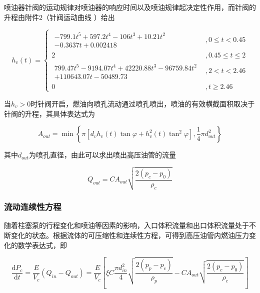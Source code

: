 \documentclass[withoutpreface,bwprint]{cumcmthesis} %
\begin{document}
			喷油器针阀的运动规律对喷油器的响应时间以及喷油规律起决定性作用，而针阀的升程由附件2（针阀运动曲线 ）给出
			
			\begin{equation}
			h_v(t) = \left\{ \begin{array}{ll} \begin{array}{ll}
			-799.1 t^5 + 597.2 t^4 - 106 t^3 + 10.21 t^2 \\ -  0.3637 t + 0.002418 \end{array} &, 0 \leq t < 0.45 \\
			2 &, 0.45 \leq t \leq 2 \\
			\begin{array}{ll}
			799.47t^5 - 9194.07 t^4 + 42220.88 t^3 - 96759.84 t^2 \\ + 110643.07 t - 50489.73 
			\end{array} &, 2 < t < 2.46 \\
			0 &, t \geq 2.46
			\end{array} \right.
			\end{equation}
			
			当$h_v > 0$时针阀开启，燃油向喷孔流动通过喷孔喷出，喷油的有效横截面积取决于针阀的升程，其具体表达式为
			
			\begin{equation}A_{out} = \min\left\{ \pi[d_v h_v(t) \tan \varphi + h_v^2(t) \tan^2\varphi ], \frac{1}{4} \pi d_{out}^2 \right\}\end{equation}
			
			其中$d_{out}$为喷孔直径，由此可以求出喷出高压油管的流量
			
			\begin{equation}Q_{out} = CA_{out} \sqrt{\frac{2(p_c - p_0)}{\rho_c}}\end{equation}
			
			
			
			\subsubsection{流动连续性方程}
			
			随着柱塞泵的行程变化和喷油等因素的影响，入口体积流量和出口体积流量处于不断变化的状态。根据流体的可压缩性和连续性方程，可得到高压油管内燃油压力变化的数学表达式，即
			
			\begin{equation}\frac{\mathrm{d}P_c}{\mathrm{d}t} = \frac{E}{V_c}(Q_{in} - Q_{out}) = \frac{E}{V_c} \left[ \xi C \frac{\pi d_{in}^2}{4} \sqrt{\frac{2(p_p - p_c)}{\rho_p}} - CA_{out} \sqrt{\frac{2(p_c - p_0)}{\rho_c}} \right]\end{equation}
			
\end{document}
